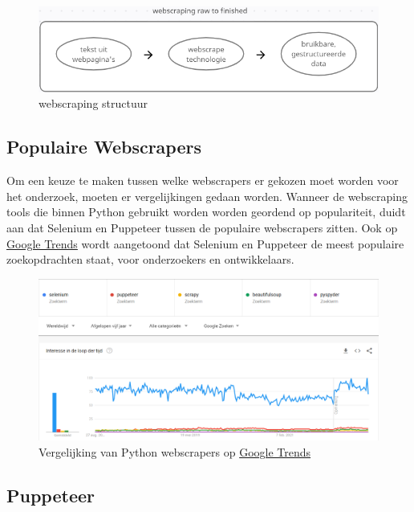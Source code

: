 \begin{figure}[bh]
	\centering
	\includegraphics{webscraping_cycle}
	\caption{webscraping structuur}
\end{figure}

\subsection{Populaire Webscrapers}

Om een keuze te maken tussen welke webscrapers er gekozen moet worden voor het onderzoek, moeten er vergelijkingen gedaan worden.
Wanneer de webscraping tools die binnen Python gebruikt worden worden geordend op populariteit, duidt aan dat Selenium en Puppeteer tussen de populaire webscrapers zitten. \autocite{Saurkar2018}
Ook op \href{https://trends.google.com/trends}{Google Trends} wordt aangetoond dat Selenium en Puppeteer de meest populaire zoekopdrachten staat, voor onderzoekers en ontwikkelaars.

\begin{figure}[bh]
	\centering
	\includegraphics[width=\textwidth, height=\textheight, keepaspectratio]{python_webscrapers_google_trends}
	\caption{Vergelijking van Python webscrapers op \href{https://trends.google.com/trends}{Google Trends}}
\end{figure}

\subsection{Puppeteer}

